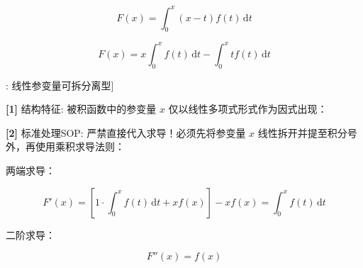 \documentclass[11pt,a4paper,UTF8]{ctexart}
\begin{document}
\begin{equation*}
F(x) = \int_0^x (x - t)f(t)\,\mathrm{d}t
\end{equation*}

\begin{equation*}
F(x) = x\int_0^x f(t)\,\mathrm{d}t - \int_0^x tf(t)\,\mathrm{d}t
\end{equation*}
\begin{thmbox}[模型[1]: 线性参变量可拆分离型]

\textbf{[1]} 结构特征: 被积函数中的参变量 $x$ 仅以线性多项式形式作为因式出现：


\textbf{[2]} 标准处理SOP: 严禁直接代入求导！必须先将参变量 $x$ 线性拆开并提至积分号外，再使用乘积求导法则：


两端求导：


\begin{equation*}
F'(x) = \left[ 1 \cdot \int_0^x f(t)\,\mathrm{d}t + x f(x) \right] - x f(x) = \int_0^x f(t)\,\mathrm{d}t
\end{equation*}


二阶求导：


\begin{equation*}
F''(x) = f(x)
\end{equation*}


\end{thmbox}
\end{document}
